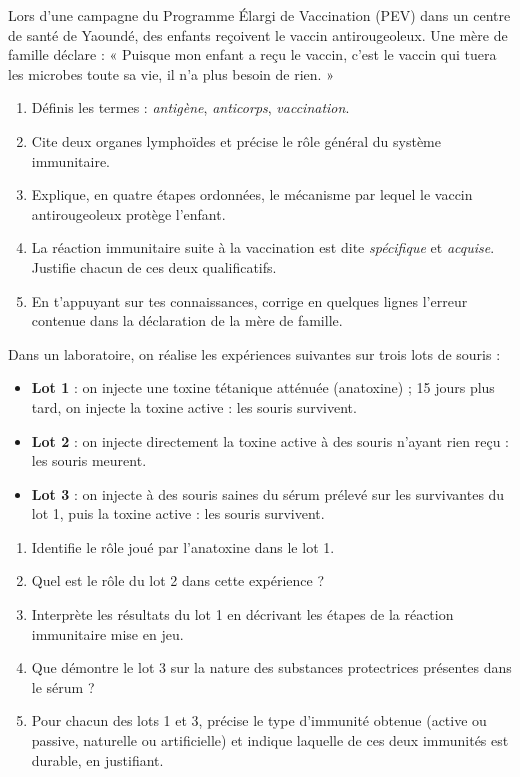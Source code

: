 \documentclass[11pt]{article}
\newcounter{popsec}
\newcounter{popsub}
\newcommand{\courssub}[1]{%
  \stepcounter{popsub}%
  \par\vspace{9pt}\noindent{\popxbold\fontsize{11.5}{13}\selectfont\color{popink}{\color{poporange}\thepopsec.\thepopsub}\hspace{6pt}#1}\par\nopagebreak\vspace{4pt}
}
\begin{document}
\courssub{Je me prépare au Probatoire}

\begin{exercice}
Lors d'une campagne du Programme Élargi de Vaccination (PEV) dans un centre de santé de Yaoundé, des enfants reçoivent le vaccin antirougeoleux. Une mère de famille déclare : « Puisque mon enfant a reçu le vaccin, c'est le vaccin qui tuera les microbes toute sa vie, il n'a plus besoin de rien. »
\begin{enumerate}
\item Définis les termes : \emph{antigène}, \emph{anticorps}, \emph{vaccination}.
\item Cite deux organes lymphoïdes et précise le rôle général du système immunitaire.
\item Explique, en quatre étapes ordonnées, le mécanisme par lequel le vaccin antirougeoleux protège l'enfant.
\item La réaction immunitaire suite à la vaccination est dite \emph{spécifique} et \emph{acquise}. Justifie chacun de ces deux qualificatifs.
\item En t'appuyant sur tes connaissances, corrige en quelques lignes l'erreur contenue dans la déclaration de la mère de famille.
\end{enumerate}
\end{exercice}

\begin{exercice}
Dans un laboratoire, on réalise les expériences suivantes sur trois lots de souris :
\begin{itemize}
\item \textbf{Lot 1} : on injecte une toxine tétanique atténuée (anatoxine) ; 15 jours plus tard, on injecte la toxine active : les souris survivent.
\item \textbf{Lot 2} : on injecte directement la toxine active à des souris n'ayant rien reçu : les souris meurent.
\item \textbf{Lot 3} : on injecte à des souris saines du sérum prélevé sur les survivantes du lot 1, puis la toxine active : les souris survivent.
\end{itemize}
\begin{enumerate}
\item Identifie le rôle joué par l'anatoxine dans le lot 1.
\item Quel est le rôle du lot 2 dans cette expérience ?
\item Interprète les résultats du lot 1 en décrivant les étapes de la réaction immunitaire mise en jeu.
\item Que démontre le lot 3 sur la nature des substances protectrices présentes dans le sérum ?
\item Pour chacun des lots 1 et 3, précise le type d'immunité obtenue (active ou passive, naturelle ou artificielle) et indique laquelle de ces deux immunités est durable, en justifiant.
\end{enumerate}
\end{exercice}
\end{document}
